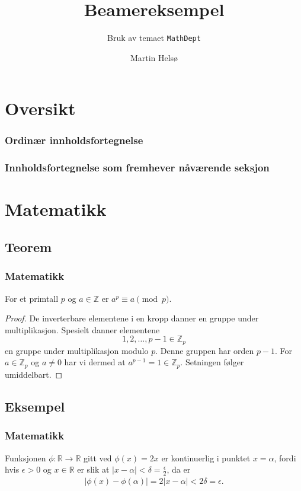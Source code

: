 \documentclass[norsk]{beamer}
\author{Martin Helsø}
\title{Beamereksempel}
\subtitle{Bruk av temaet \texttt{MathDept}}
\begin{document}
\section{Oversikt}


%
%
\begin{frame}
    \frametitle{Ordinær innholdsfortegnelse}
    \tableofcontents
\end{frame}


\begin{frame}
    \frametitle{Innholdsfortegnelse som fremhever nåværende seksjon}
    \tableofcontents[currentsection]
\end{frame}


\section{Matematikk}


\subsection{Teorem}


\begin{frame}
    \frametitle{Matematikk}

    \begin{theorem}
        For et primtall $p$ og $a \in \mathbb{Z}$ er $a^p \equiv a \pmod{p}$.
    \end{theorem}

    \begin{proof}
        De inverterbare elementene i en kropp danner en gruppe under multi\-plikasjon. Spesielt danner elementene 
        \[
            1, 2, \ldots, p-1 \in \mathbb{Z}_p
        \]
        en gruppe under multiplikasjon modulo $p$. Denne gruppen har orden $p-1$. For $a \in \mathbb{Z}_p$ og $a \neq 0$ har vi dermed at $a^{p-1} = 1 \in \mathbb{Z}_p$. Setningen følger umiddelbart.
    \end{proof}
\end{frame}


\subsection{Eksempel}


\begin{frame}
    \frametitle{Matematikk}

    \begin{example}
        Funksjonen $\phi \colon \mathbb{R} \to \mathbb{R}$ gitt ved $\phi(x) = 2x$ er kontinuerlig i punktet $x = \alpha$, fordi hvis $\epsilon > 0$ og $x \in \mathbb{R}$ er slik at $|x - \alpha| < \delta = \frac{\epsilon}{2}$, da er
        \begin{align*}
            |\phi(x) - \phi(\alpha)| = 2|x - \alpha| < 2\delta = \epsilon.
        \end{align*}
    \end{example}
\end{frame}
\end{document}
